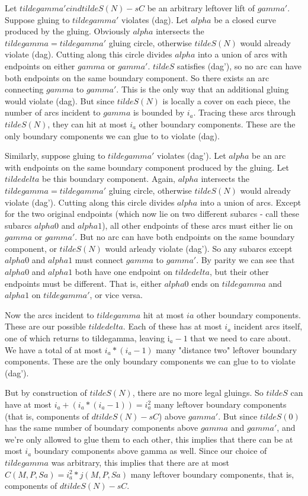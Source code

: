\documentclass[12pt]{amsart}
\theoremstyle{definition}
\theoremstyle{remark}
\begin{document}
Let $tildegamma' cin dtildeS(N) - sC$ be an arbitrary leftover lift of
$gamma'$.  Suppose gluing to $tildegamma'$ violates (dag). Let $alpha$ be
a closed curve produced by the gluing.  Obviously $alpha$ intersects the
$tildegamma = tildegamma'$ gluing circle, otherwise $tildeS(N)$ would already
violate (dag).  Cutting along this circle divides $alpha$ into a union of arcs
with endpoints on either $gamma$ or $gamma'$.  $tildeS$ satisfies (dag'), so no
arc can have both endpoints on the same boundary component. So there exists an
arc connecting $gamma$ to $gamma'$. This is the only way that an additional
gluing would violate (dag). But since $tildeS(N)$ is locally a cover on each
piece, the number of arcs incident to $gamma$ is bounded by $i_a$.
Tracing these arcs through $tildeS(N)$, they can hit at most $i_a$ other
boundary components.  These are the only boundary components we can glue to to
violate (dag).

Similarly, suppose gluing to $tildegamma'$ violates (dag'). Let $alpha$ be an
arc with endpoints on the same boundary component produced by the gluing. Let
$tildedelta$ be this boundary component. Again, $alpha$ intersects the
$tildegamma = tildegamma'$ gluing circle, otherwise $tildeS(N)$ would already
violate (dag').  Cutting along this circle divides $alpha$ into a union of
arcs.  Except for the two original endpoints (which now lie on two different
subarcs - call these subarcs $alpha0$ and $alpha1$), all other endpoints of
these arcs must either lie on $gamma$ or $gamma'$.  But no arc can have both
endpoints on the same boundary component, or $tildeS(N)$ would arleady violate
(dag'). So any subarcs except $alpha0$ and $alpha1$ must connect $gamma$ to
$gamma'$.  By parity we can see that $alpha0$ and $alpha1$ both have one
endpoint on $tildedelta$, but their other endpoints must be different. That is,
either $alpha0$ ends on $tildegamma$ and $alpha1$ on $tildegamma'$, or vice
versa.

Now the arcs incident to $tildegamma$ hit at most $ia$ other boundary
components. These are our possible $tildedelta$. Each of these has at most
$i_a$ incident arcs itself, one of which returns to tildegamma, leaving i$_a-1$
that we need to care about. We have a total of at most $i_a*(i_a-1)$ many
"distance two" leftover boundary components. These are the only boundary
components we can glue to to violate (dag').

But by construction of $tildeS(N)$, there are no more legal gluings. So
$tildeS$ can have at most $i_a+(i_a*(i_a-1)) = i_a^2$ many leftover boundary
components (that is, components of $dtildeS(N)-sC$) above $gamma'$.  But since
$tildeS(0)$ has the same number of boundary components above $gamma$ and
$gamma'$, and we're only allowed to glue them to each other, this implies that
there can be at most $i_a$ boundary components above gamma as well.  Since our
choice of $tildegamma$ was arbitrary, this implies that there are at most
$C(M,P,Sa) = i_a^2*j(M,P,Sa)$ many leftover boundary components, that is,
components of $dtildeS(N)-sC$.
\end{document}
